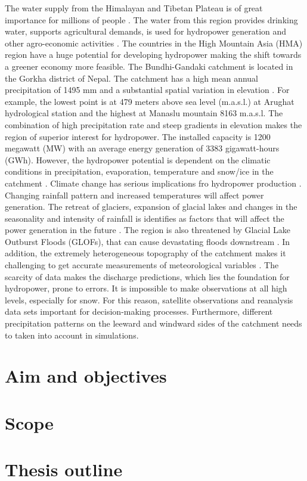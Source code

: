 The water supply from the Himalayan and Tibetan Plateau is of great importance for 
millions of people \autocite{bookhagenCompleteHimalayanHydrological2010}. The water from this region provides drinking water, 
supports agricultural demands, is used for hydropower generation and other agro-economic 
activities \autocite{menegozPrecipitationSnowCover2013}. The countries in the High Mountain Asia (HMA) 
region have a huge potential for developing hydropower making the shift towards a greener 
economy more feasible. The Bundhi-Gandaki catchment is located in the Gorkha district of Nepal. 
The catchment has a high mean annual precipitation of 1495 mm and a substantial spatial variation in 
elevation \autocite{devkotaClimateChangeAdaptation2017}. For example, the lowest point is at 479 meters above sea 
level (m.a.s.l.) at Arughat hydrological station and the highest at Manaslu mountain 8163 m.a.s.l. The 
combination of high precipitation rate and steep gradients in elevation makes the region of superior 
interest for hydropower. The installed capacity is 1200 megawatt (MW) with an average energy generation 
of 3383 gigawatt-hours (GWh). However, the hydropower potential is dependent on the climatic conditions 
in precipitation, evaporation, temperature and snow/ice in the catchment \autocite{edenhoferRenewableEnergySources2011}. 
Climate change has serious implications fro hydropower production \autocite{dandekhyaGandakiBasinMaintaining2017}. 
Changing rainfall pattern and increased temperatures will affect power generation. The retreat of 
glaciers, expansion of glacial lakes and changes in the seasonality and intensity of rainfall is 
identifies as factors that will affect the power generation in the future \autocite{dandekhyaGandakiBasinMaintaining2017}.
The region is also threatened by Glacial Lake Outburst Floods (GLOFs), that can cause devastating floods 
downstream \autocite{dandekhyaGandakiBasinMaintaining2017}. In addition, the extremely heterogeneous topography of the 
catchment makes it challenging to get accurate measurements of meteorological 
variables \autocite{pellicciottiChallengesUncertaintiesHydrological2012}. The scarcity of data makes the discharge predictions, 
which lies the foundation for hydropower, prone to errors. It is impossible to make observations at 
all high levels, especially for snow. For this reason, satellite observations and reanalysis data sets 
important for decision-making processes. Furthermore, different precipitation patterns on the leeward and 
windward sides of the catchment needs to taken into account in simulations.


\section{Aim and objectives}

\section{Scope}

\section{Thesis outline}